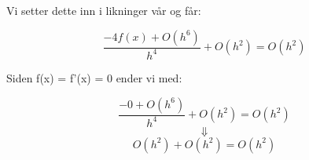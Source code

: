 Vi setter dette inn i likninger vår og får:

\begin{equation*}
\frac{-4f(x) + O(h^6)}{h^4} + O(h^2) = O(h^2)
\end{equation*}

Siden f(x) = f'(x) = 0 ender vi med:


\begin{equation*}
\frac{-0+ O(h^6)}{h^4} + O(h^2) = O(h^2)
\end{equation*}
\begin{equation*}
\Downarrow
\end{equation*}
\begin{equation*}
O(h^2) + O(h^2) = O(h^2)
\end{equation*}
